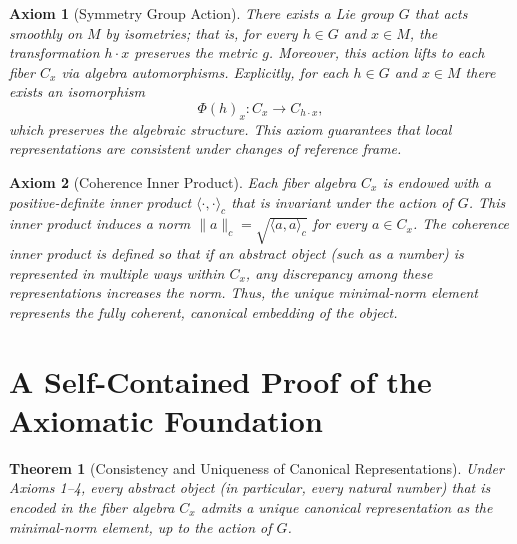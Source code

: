 \documentclass[12pt]{article}
\newtheorem{axiom}{Axiom}[section]
\newtheorem{theorem}{Theorem}[section]
\begin{document}
\begin{axiom}[Symmetry Group Action]
There exists a Lie group \(G\) that acts smoothly on \(M\) by isometries; that is, for every \(h \in G\) and \(x \in M\), the transformation \(h \cdot x\) preserves the metric \(g\). Moreover, this action lifts to each fiber \(C_x\) via algebra automorphisms. Explicitly, for each \(h \in G\) and \(x \in M\) there exists an isomorphism
\[
\Phi(h)_x : C_x \to C_{h\cdot x},
\]
which preserves the algebraic structure. This axiom guarantees that local representations are consistent under changes of reference frame.
\end{axiom}

\begin{axiom}[Coherence Inner Product]
Each fiber algebra \(C_x\) is endowed with a positive-definite inner product \(\langle \cdot, \cdot \rangle_c\) that is invariant under the action of \(G\). This inner product induces a norm \(\|a\|_c = \sqrt{\langle a, a \rangle_c}\) for every \(a \in C_x\). The coherence inner product is defined so that if an abstract object (such as a number) is represented in multiple ways within \(C_x\), any discrepancy among these representations increases the norm. Thus, the unique minimal-norm element represents the fully coherent, canonical embedding of the object.
\end{axiom}

\section{A Self-Contained Proof of the Axiomatic Foundation}

\begin{theorem}[Consistency and Uniqueness of Canonical Representations]
Under Axioms 1--4, every abstract object (in particular, every natural number) that is encoded in the fiber algebra \(C_x\) admits a unique canonical representation as the minimal-norm element, up to the action of \(G\).
\end{theorem}
\end{document}
